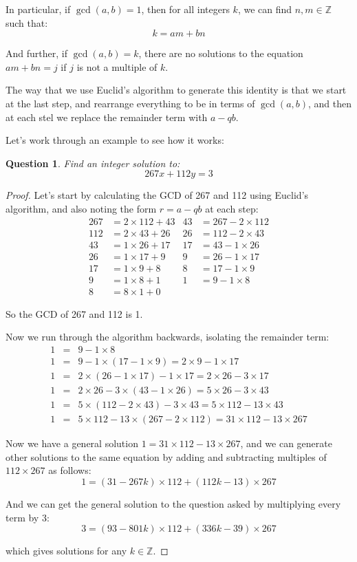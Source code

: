 \documentclass{article}
\newtheorem{question}{Question}[section]
\begin{document}
In particular, if $\gcd(a,b)=1$, then for all integers $k$, we can find $n,m\in \mathbb{Z}$ such that:
\[ k = am + bn \]

And further, if $\gcd(a,b)=k$, there are no solutions to the equation $am+bn=j$ if $j$ is not a
multiple of $k$.

The way that we use Euclid's algorithm to generate this identity is that we start at the last step,
and rearrange everything to be in terms of $\gcd(a,b)$, and then at each stel we replace the remainder
term with $a-qb$.

Let's work through an example to see how it works:

\begin{question}
	Find an integer solution to:
	\[ 267x + 112y = 3 \]
\end{question}
\begin{proof}
	Let's start by calculating the GCD of 267 and 112 using Euclid's algorithm, and also
	noting the form $r = a-qb$ at each step:
	\begin{align*}
		267 &= 2 \times 112 + 43 & 43 &= 267 - 2 \times 112 \\
		112 &= 2 \times 43 + 26 & 26 &= 112 - 2 \times 43\\
		43 &= 1 \times 26 + 17 & 17 &= 43 - 1 \times 26 \\
		26 &= 1 \times 17 + 9 & 9 &= 26 - 1 \times 17 \\
		17 &= 1 \times 9 + 8 & 8 &= 17 - 1 \times 9 \\
		9 &= 1 \times 8 + 1 & 1 &= 9 - 1 \times 8 \\
		8 &= 8 \times 1 + 0 &&
	\end{align*}

	So the GCD of 267 and 112 is 1.

	Now we run through the algorithm backwards, isolating the remainder term:
	\begin{eqnarray*}
		1 &=&  9 - 1 \times 8  \\
		1 &=&  9 - 1 \times (17 - 1 \times 9) = 2 \times 9 -1 \times 17  \\
		1 &=&  2 \times (26 - 1 \times 17) - 1 \times 17 = 2 \times 26 - 3 \times 17  \\
		1 &=&  2 \times 26 - 3 \times (43 - 1 \times 26) = 5 \times 26 - 3 \times 43  \\
		1 &=&  5 \times (112 - 2 \times 43) - 3 \times 43 = 5 \times 112 -13 \times 43 \\
		1 &=&  5 \times 112 - 13 \times (267 - 2 \times 112) = 31 \times 112 - 13 \times 267
	\end{eqnarray*}

	Now we have a general solution $1 = 31\times 112 - 13\times 267$, and we can generate other
	solutions to the same equation by adding and subtracting multiples of $112 \times 267$ as follows:
	\[ 1 = (31-267k) \times 112 + (112k - 13) \times 267 \]
	
	And we can get the general solution to the question asked by multiplying every term by 3:
	\[ 3 = (93-801k) \times 112 + (336k - 39) \times 267 \]

	which gives solutions for any $k\in \mathbb{Z}$.

\end{proof}
\end{document}
